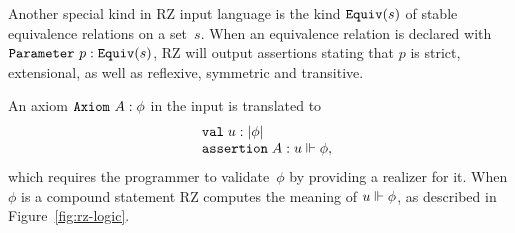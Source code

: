 Another special kind in RZ input language is the kind $\mathtt{Equiv}(s)$ of
stable equivalence relations on a set~$s$. When an equivalence
relation is declared with $\mathtt{Parameter}\ p : \mathtt{Equiv}(s)$, RZ will output
assertions stating that $p$ is strict, extensional, as well as
reflexive, symmetric and transitive.

An axiom $\mathtt{Axiom}\ A : \phi$ in the input is translated to
%
\[
\begin{array}{ll}
  & \mathtt{val}\;u:|\phi| \\
  & \mathtt{assertion}\; A : u \Vdash \phi,
\end{array}
\]
%
which requires the programmer to validate~$\phi$ by providing a
realizer for it. When $\phi$ is a compound statement RZ computes the
meaning of $u \Vdash \phi$, as described in Figure~\ref{fig:rz-logic}.



